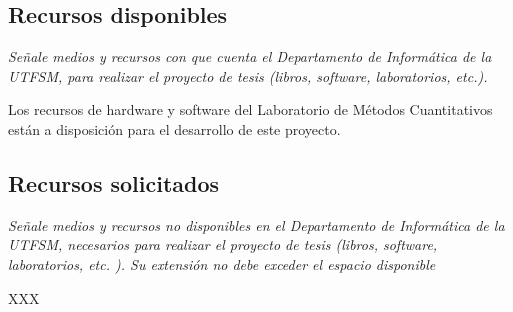 \documentclass[11pt,spanish]{article}
\begin{document}
\subsection{Recursos disponibles}

\emph{Señale medios y recursos con que cuenta el Departamento de Informática de
la UTFSM, para realizar el proyecto de tesis (libros, software, laboratorios,
etc.).}

Los recursos de hardware y software del Laboratorio de Métodos Cuantitativos
están a disposición para el desarrollo de este proyecto.

\subsection{Recursos solicitados}

\emph{Señale medios y recursos no disponibles en el Departamento de Informática
de la UTFSM, necesarios para realizar el proyecto de tesis (libros, software,
laboratorios, etc. ). Su extensión no debe exceder el espacio disponible}

XXX
\end{document}
